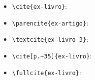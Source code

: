 \documentclass[a4paper]{article}
\begin{document}
\begin{itemize}
  \item \verb|\cite{ex-livro}|: \cite{ex-livro}
  \item \verb|\parencite{ex-artigo}|: \parencite{ex-artigo}
  \item \verb|\textcite{ex-livro-3}|: \textcite{ex-livro-3}
  \item \verb|\cite[p.~35]{ex-livro}|: \cite[p.~35]{ex-livro}
  \item \verb|\fullcite{ex-livro}|: 
\end{itemize}

\printbibliography
\end{document}
